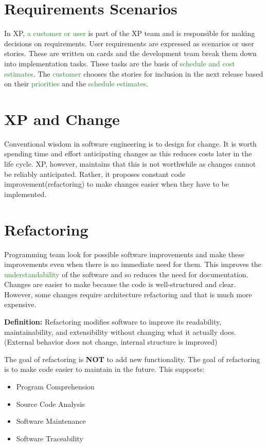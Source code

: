 \documentclass{report}
\newcommand{\textg}[1]{\textcolor{ForestGreen}{#1}}
\begin{document}
\section{Requirements Scenarios}
\noindent In XP, \textg{a customer or user} is part of the XP team and is responsible for making decisions on requirements. User requirements are expressed as scenarios or user stories. These are written on cards and the development team break them down into implementation tasks. These tasks are the basis of \textg{schedule and cost estimates}. The \textg{customer} chooses the stories for inclusion in the next release based on their \textg{priorities} and the \textg{schedule estimates}.


\section{XP and Change}
\noindent Conventional wisdom in software engineering is to design for change. It is worth spending time and effort anticipating changes as this reduces costs later in the life cycle. XP, however, maintains that this is not worthwhile as changes cannot be reliably anticipated. Rather, it proposes constant code improvement(refactoring) to make changes easier when they have to be implemented.

\section{Refactoring}
\noindent Programming team look for possible software improvements and make these improvements even when there is no immediate need for them. This improves the \textg{understandability} of the software and so reduces the need for documentation. Changes are easier to make because the code is well-structured and clear. However, some changes require architecture refactoring and that is much more expensive.\newline

\noindent \textbf{Definition:} Refactoring modifies software to improve its readability, maintainability, and extensibility without changing what it actually does. (External behavior does not change, internal structure is improved)\newline

\noindent The goal of refactoring is \textbf{NOT} to add new functionality. The goal of refactoring is to make code easier to maintain in the future. This supports:
\begin{itemize}
  \item Program Comprehension
  \item Source Code Analysis
  \item Software Maintenance
  \item Software Traceability
\end{itemize}
\end{document}
